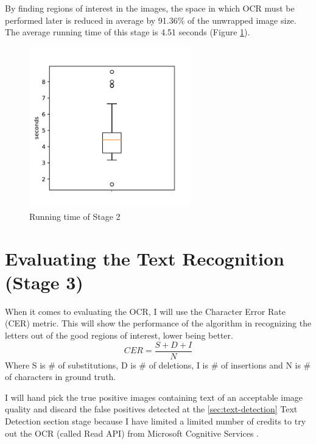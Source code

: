 By finding regions of interest in the images, the space in which OCR must be performed later is reduced in average by 91.36\% of the unwrapped image size. The average running time of this stage is 4.51 seconds (Figure \ref{fig:running_time-stage2}).

\begin{figure}
    \centering
    \begin{minipage}[c]{0.5\linewidth}
        \centering
        \includegraphics[height=7cm, keepaspectratio]{img/evaluation/running_time-stage2.pdf}
            \caption{Running time of Stage 2}
            \label{fig:running_time-stage2}
    \end{minipage}\hfill
\end{figure}

\section{Evaluating the Text Recognition (Stage 3)}\label{section:evaluation-ocr}

When it comes to evaluating the OCR, I will use the Character Error Rate (CER) \cite{site:evaluation-OCR-character_error_rate} metric. This will show the performance of the algorithm in recognizing the letters out of the good regions of interest, lower being better.
\[CER = \frac{S + D + I}{N}\]
Where S is \# of substitutions, D is \# of deletions, I is \# of insertions and N is \# of characters in ground truth.

I will hand pick the true positive images containing text of an acceptable image quality and discard the false positives detected at the \ref{sec:text-detection} Text Detection section stage because I have limited a limited number of credits to try out the OCR (called Read API) from Microsoft Cognitive Services \cite{site:Microsoft_Cognitive_Services}.

